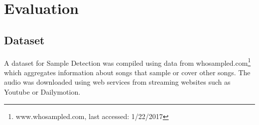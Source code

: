 \documentclass{article}
\begin{document}

\section{Evaluation}
\label{eval}

\subsection{Dataset}
A dataset for Sample Detection was compiled using data from whosampled.com\footnote{www.whosampled.com, last accessed: 1/22/2017} which aggregates information about songs that sample or cover other songs. The audio was downloaded using web services from streaming websites such as Youtube or Dailymotion.

\end{document}
